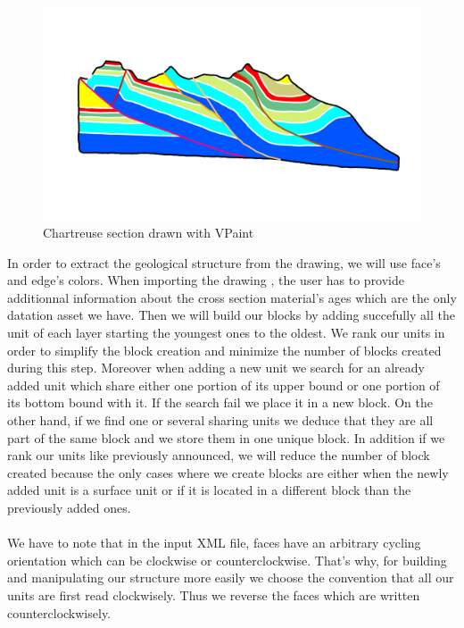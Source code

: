\documentclass[12pt, a4paper]{report} %
\begin{document}

 \begin{figure}[H]
	\centering
	\includegraphics[scale=0.5]{chartreusevpaint.png}
	\caption{Chartreuse section drawn with VPaint}
	\label{chartreusevpaint}
\end{figure}
In order to extract the geological structure from the drawing, we will use face's and edge's colors. When importing the drawing , the user has to provide additionnal information about the cross section material's ages which are the only datation asset we have. Then we will build our blocks by adding succefully all the unit of each layer starting the youngest ones to the oldest. We rank our units in order to simplify the block creation and minimize the number of blocks created during this step. Moreover when adding a new unit we search for an already added unit which share either one portion of its upper bound  or one portion of its bottom bound with it. If the search fail we place it in a new block. On the other hand, if we find one or several sharing units we deduce that they are all part of the same block and we store them in one unique block. In addition if we rank our units like previously announced, we will reduce the number of block created because the only cases where we create blocks are either when the newly added unit is a surface unit or if it is located in a different block than the previously added ones.\\\\
We have to note that in the input XML file, faces have an arbitrary cycling orientation which can be clockwise or counterclockwise. 
That's why, for building and manipulating our structure more easily we choose the convention that all our units are first read clockwisely. Thus we reverse the faces which are written counterclockwisely.\\\\ 
\end{document}
